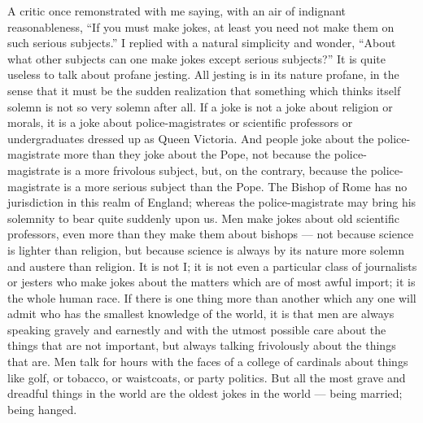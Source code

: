 A critic once remonstrated with me saying, with an air of indignant reasonableness, “If you must make jokes, at least you need not make them on such serious subjects.” I replied with a natural simplicity and wonder, “About what other subjects can one make jokes except serious subjects?” It is quite useless to talk about profane jesting. All jesting is in its nature profane, in the sense that it must be the sudden realization that something which thinks itself solemn is not so very solemn after all. If a joke is not a joke about religion or morals, it is a joke about police-magistrates or scientific professors or undergraduates dressed up as Queen Victoria. And people joke about the police-magistrate more than they joke about the Pope, not because the police-magistrate is a more frivolous subject, but, on the contrary, because the police-magistrate is a more serious subject than the Pope. The Bishop of Rome has no jurisdiction in this realm of England; whereas the police-magistrate may bring his solemnity to bear quite suddenly upon us. Men make jokes about old scientific professors, even more than they make them about bishops — not because science is lighter than religion, but because science is always by its nature more solemn and austere than religion. It is not I; it is not even a particular class of journalists or jesters who make jokes about the matters which are of most awful import; it is the whole human race. If there is one thing more than another which any one will admit who has the smallest knowledge of the world, it is that men are always speaking gravely and earnestly and with the utmost possible care about the things that are not important, but always talking frivolously about the things that are. Men talk for hours with the faces of a college of cardinals about things like golf, or tobacco, or waistcoats, or party politics. But all the most grave and dreadful things in the world are the oldest jokes in the world — being married; being hanged.

